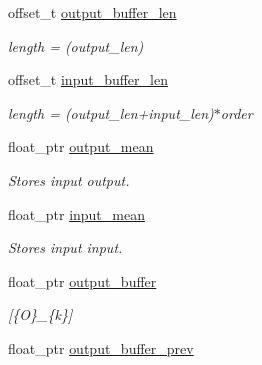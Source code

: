 \begin{DoxyCompactItemize}
\item 
\hypertarget{struct_n_a_r_x_net_a8263dd2f5608cff58356ddb5586fce94}{offset\-\_\-t \hyperlink{struct_n_a_r_x_net_a8263dd2f5608cff58356ddb5586fce94}{output\-\_\-buffer\-\_\-len}}\label{struct_n_a_r_x_net_a8263dd2f5608cff58356ddb5586fce94}

\begin{DoxyCompactList}\small\item\em length = (output\-\_\-len) \end{DoxyCompactList}\item 
\hypertarget{struct_n_a_r_x_net_ab65456ccd9169e260ea84c3a955bc065}{offset\-\_\-t \hyperlink{struct_n_a_r_x_net_ab65456ccd9169e260ea84c3a955bc065}{input\-\_\-buffer\-\_\-len}}\label{struct_n_a_r_x_net_ab65456ccd9169e260ea84c3a955bc065}

\begin{DoxyCompactList}\small\item\em length = (output\-\_\-len+input\-\_\-len)$\ast$order \end{DoxyCompactList}\item 
\hypertarget{struct_n_a_r_x_net_a59b7c1428ec8f98e300d4a2fc2473dfa}{float\-\_\-ptr \hyperlink{struct_n_a_r_x_net_a59b7c1428ec8f98e300d4a2fc2473dfa}{output\-\_\-mean}}\label{struct_n_a_r_x_net_a59b7c1428ec8f98e300d4a2fc2473dfa}

\begin{DoxyCompactList}\small\item\em Stores input output. \end{DoxyCompactList}\item 
\hypertarget{struct_n_a_r_x_net_ae5f9c486b6e054e3f443592831912aa2}{float\-\_\-ptr \hyperlink{struct_n_a_r_x_net_ae5f9c486b6e054e3f443592831912aa2}{input\-\_\-mean}}\label{struct_n_a_r_x_net_ae5f9c486b6e054e3f443592831912aa2}

\begin{DoxyCompactList}\small\item\em Stores input input. \end{DoxyCompactList}\item 
\hypertarget{struct_n_a_r_x_net_a928aede8b09ed82869de7c1152286e8d}{float\-\_\-ptr \hyperlink{struct_n_a_r_x_net_a928aede8b09ed82869de7c1152286e8d}{output\-\_\-buffer}}\label{struct_n_a_r_x_net_a928aede8b09ed82869de7c1152286e8d}

\begin{DoxyCompactList}\small\item\em \mbox{[}\{O\}\-\_\-\{k\}\mbox{]} \end{DoxyCompactList}\item 
\hypertarget{struct_n_a_r_x_net_acbaab6607adef4c8ec9c427a918c9fc7}{float\-\_\-ptr \hyperlink{struct_n_a_r_x_net_acbaab6607adef4c8ec9c427a918c9fc7}{output\-\_\-buffer\-\_\-prev}}\label{struct_n_a_r_x_net_acbaab6607adef4c8ec9c427a918c9fc7}


\end{DoxyCompactItemize}
